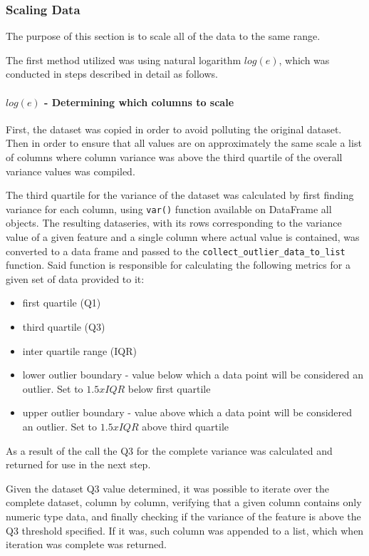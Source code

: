 \subsubsection{Scaling Data}
The purpose of this section is to scale all of the data to the same range. 

The first method utilized was using natural logarithm $log(e)$, which was conducted in steps described in detail as follows.
\paragraph{$log(e)$ - Determining which columns to scale}
First, the dataset was copied in order to avoid polluting the original dataset. Then in order to ensure that all values are on approximately the same scale a list of columns where column variance was above the third quartile of the overall variance values was compiled. 

The third quartile for the variance of the dataset was calculated by first finding variance for each column, using \texttt{var()} function available on DataFrame all objects. The resulting dataseries, with its rows corresponding to the variance value of a given feature and a single column where actual value is contained, was converted to a data frame and passed to the \texttt{collect\_outlier\_data\_to\_list} function. Said function is responsible for calculating the following metrics for a given set of data provided to it:
\begin{itemize}
    \item first quartile (Q1)
    \item third quartile (Q3)
    \item inter quartile range (IQR)
    \item lower outlier boundary - value below which a data point will be considered an outlier. Set to $1.5x IQR$ below first quartile
    \item upper outlier boundary - value above which a data point will be considered an outlier. Set to $1.5x IQR$ above third quartile
\end{itemize}

As a result of the call the Q3 for the complete variance was calculated and returned for use in the next step.

Given the dataset Q3 value determined, it was possible to iterate over the complete dataset, column by column, verifying that a given column contains only numeric type data, and finally checking if the variance of the feature is above the Q3 threshold specified. If it was, such column was appended to a list, which when iteration was complete was returned. 

